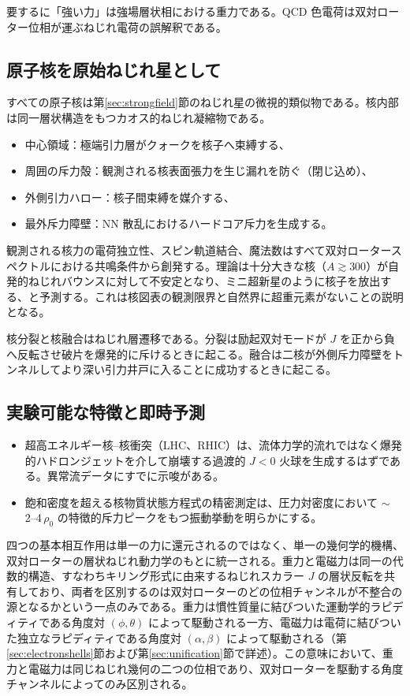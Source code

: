 \documentclass[dvipdfmx,a4paper]{article}
\begin{document}
要するに「強い力」は強場層状相における重力である。QCD 色電荷は双対ローター位相が運ぶねじれ電荷の誤解釈である。

\subsection{原子核を原始ねじれ星として}

すべての原子核は第\ref{sec:strongfield}節のねじれ星の微視的類似物である。核内部は同一層状構造をもつカオス的ねじれ凝縮物である。

\begin{itemize}
\item 中心領域：極端引力層がクォークを核子へ束縛する、
\item 周囲の斥力殻：観測される核表面張力を生じ漏れを防ぐ（閉じ込め）、
\item 外側引力ハロー：核子間束縛を媒介する、
\item 最外斥力障壁：NN 散乱におけるハードコア斥力を生成する。
\end{itemize}

観測される核力の電荷独立性、スピン軌道結合、魔法数はすべて双対ロータースペクトルにおける共鳴条件から創発する。理論は十分大きな核（$A \gtrsim 300$）が自発的ねじれバウンスに対して不安定となり、ミニ超新星のように核子を放出する、と予測する。これは核図表の観測限界と自然界に超重元素がないことの説明となる。

核分裂と核融合はねじれ層遷移である。分裂は励起双対モードが $J$ を正から負へ反転させ破片を爆発的に斥けるときに起こる。融合は二核が外側斥力障壁をトンネルしてより深い引力井戸に入ることに成功するときに起こる。

\subsection{実験可能な特徴と即時予測}

\begin{itemize}
\item 超高エネルギー核--核衝突（LHC、RHIC）は、流体力学的流れではなく爆発的ハドロンジェットを介して崩壊する過渡的 $J < 0$ 火球を生成するはずである。異常流データにすでに示唆がある。
\item 飽和密度を超える核物質状態方程式の精密測定は、圧力対密度において $\sim$ 2--4\,$\rho_0$ の特徴的斥力ピークをもつ振動挙動を明らかにする。
\end{itemize}

四つの基本相互作用は単一の力に還元されるのではなく、単一の幾何学的機構、双対ローターの層状ねじれ動力学のもとに統一される。重力と電磁力は同一の代数的構造、すなわちキリング形式に由来するねじれスカラー $J$ の層状反転を共有しており、両者を区別するのは双対ローターのどの位相チャンネルが不整合の源となるかという一点のみである。重力は慣性質量に結びついた運動学的ラピディティである角度対 $(\phi, \theta)$ によって駆動される一方、電磁力は電荷に結びついた独立なラピディティである角度対 $(\alpha, \beta)$ によって駆動される（第\ref{sec:electronshells}節および第\ref{sec:unification}節で詳述）。この意味において、重力と電磁力は同じねじれ幾何の二つの位相であり、双対ローターを駆動する角度チャンネルによってのみ区別される。
\end{document}
